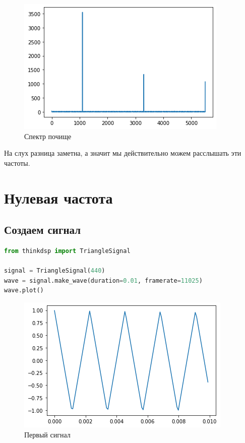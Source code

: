 \documentclass[a4paper,12pt]{report}
\begin{document}
    \begin{figure}[H]
        \centering
        \includegraphics[width=\textwidth]{ex3_better_signal.png}
        \caption{Спектр почище}
        \label{fig:ex3_better_signal}
    \end{figure}
    
    На слух разница заметна, а значит мы действительно можем расслышать эти частоты.
    
    \chapter{Нулевая частота}
    
    \section{Создаем сигнал}
    
\begin{lstlisting}[language=Python,caption=Создаем сигнал]
from thinkdsp import TriangleSignal

signal = TriangleSignal(440)
wave = signal.make_wave(duration=0.01, framerate=11025)
wave.plot()
\end{lstlisting}

    \begin{figure}[H]
        \centering
        \includegraphics[width=\textwidth]{ex4_first.png}
        \caption{Первый сигнал}
        \label{fig:ex4_first}
    \end{figure}
    
\end{document}
